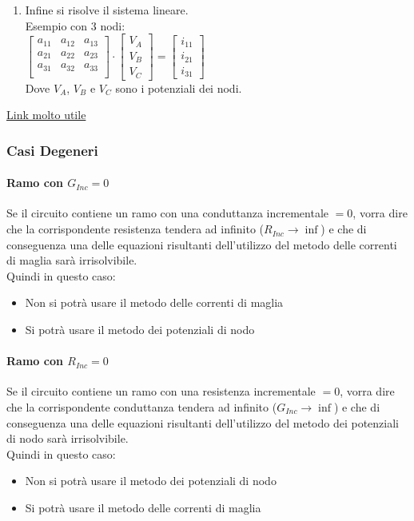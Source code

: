 \documentclass[../main.tex]{subfiles}
\begin{document}
\begin{enumerate}
		$i_{11}$ corrisponde alla somma delle delle correnti ($\frac{e}{R}$) entranti ed uscenti (a seconda del verso) dal nodo.
		\item Infine si risolve il sistema lineare.\\
		Esempio con 3 nodi:\\
		$\begin{bmatrix}
			a_{11} & a_{12} & a_{13}\\
			a_{21} & a_{22} & a_{23}\\
			a_{31} & a_{32} & a_{33}\\
		\end{bmatrix}
		\cdot 
		\begin{bmatrix}
			V_A \\
			V_B \\
			V_C 
		\end{bmatrix}
		=
		\begin{bmatrix}
			i_{11} \\
			i_{21} \\
			i_{31}
		\end{bmatrix}$\\
		Dove $V_A$, $V_B$ e $V_C$ sono i potenziali dei nodi.
	\end{enumerate}
	\href{https://www.youtube.com/watch?v=bGcHdn-mjVg}{Link molto utile}
	\subsubsection{Casi Degeneri}
	\paragraph{Ramo con $G_{Inc} = 0$}
	Se il circuito contiene un ramo con una conduttanza incrementale $= 0$, vorra dire che la corrispondente resistenza tendera ad infinito ($R_{Inc} \rightarrow \inf$) e che di conseguenza una delle equazioni risultanti dell'utilizzo del metodo delle correnti di maglia sarà irrisolvibile.\\
	Quindi in questo caso:
	\begin{itemize}
		\item Non si potrà usare il metodo delle correnti di maglia
		\item Si potrà usare il metodo dei potenziali di nodo
	\end{itemize}
	\paragraph{Ramo con $R_{Inc} = 0$}
	Se il circuito contiene un ramo con una resistenza incrementale $= 0$, vorra dire che la corrispondente conduttanza tendera ad infinito ($G_{Inc} \rightarrow \inf$) e che di conseguenza una delle equazioni risultanti dell'utilizzo del metodo dei potenziali di nodo sarà irrisolvibile.\\
	Quindi in questo caso:
	\begin{itemize}
		\item Non si potrà usare il metodo dei potenziali di nodo
		\item Si potrà usare il metodo delle correnti di maglia
	\end{itemize}
\end{document}
